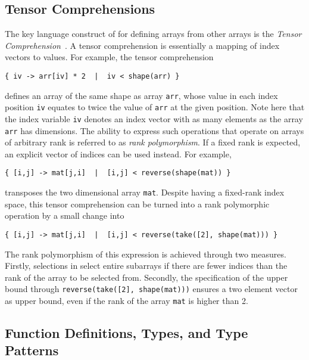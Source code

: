 \subsection{Tensor Comprehensions}

The key language construct of \sac{} for defining arrays from other arrays is the \textit{Tensor Comprehension}~\cite{sac-tensor,sac-scan}.
A tensor comprehension is essentially a mapping of index vectors to values.
For example, the tensor comprehension
%
\begin{lstlisting}
{ iv -> arr[iv] * 2  |  iv < shape(arr) }
\end{lstlisting}
%
defines an array of the same shape as array \texttt{arr}, whose value in each index position \texttt{iv} equates to twice the value of \texttt{arr} at the given position.
Note here that the index variable \texttt{iv} denotes an index vector with as many elements as the array \texttt{arr} has dimensions.
The ability to express such operations that operate on arrays of arbitrary rank is referred to as \textit{rank polymorphism}.
If a fixed rank is expected, an explicit vector of indices can be used instead.
For example,
%
\begin{lstlisting}
{ [i,j] -> mat[j,i]  |  [i,j] < reverse(shape(mat)) }
\end{lstlisting}
%
transposes the two dimensional array \texttt{mat}.
Despite having a fixed-rank index space, this tensor comprehension can be turned into a rank polymorphic operation by a small change into
%
\begin{lstlisting}
{ [i,j] -> mat[j,i]  |  [i,j] < reverse(take([2], shape(mat))) }
\end{lstlisting}
%
The rank polymorphism of this expression is achieved through two measures.
Firstly, selections in \sac{} select entire subarrays if there are fewer indices than the rank of the array to be selected from.
Secondly, the specification of the upper bound through \texttt{reverse(take([2], shape(mat)))} ensures a two element vector as upper bound, even if the rank of the array \texttt{mat} is higher than 2.

\subsection{Function Definitions, Types, and Type Patterns}

